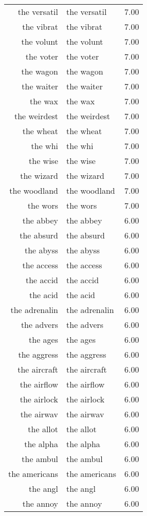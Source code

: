 \begin{table}[ht]
\begin{tabular}{rlr}
  the versatil & the versatil & 7.00 \\ 
  the vibrat & the vibrat & 7.00 \\ 
  the volunt & the volunt & 7.00 \\ 
  the voter & the voter & 7.00 \\ 
  the wagon & the wagon & 7.00 \\ 
  the waiter & the waiter & 7.00 \\ 
  the wax & the wax & 7.00 \\ 
  the weirdest & the weirdest & 7.00 \\ 
  the wheat & the wheat & 7.00 \\ 
  the whi & the whi & 7.00 \\ 
  the wise & the wise & 7.00 \\ 
  the wizard & the wizard & 7.00 \\ 
  the woodland & the woodland & 7.00 \\ 
  the wors & the wors & 7.00 \\ 
  the abbey & the abbey & 6.00 \\ 
  the absurd & the absurd & 6.00 \\ 
  the abyss & the abyss & 6.00 \\ 
  the access & the access & 6.00 \\ 
  the accid & the accid & 6.00 \\ 
  the acid & the acid & 6.00 \\ 
  the adrenalin & the adrenalin & 6.00 \\ 
  the advers & the advers & 6.00 \\ 
  the ages & the ages & 6.00 \\ 
  the aggress & the aggress & 6.00 \\ 
  the aircraft & the aircraft & 6.00 \\ 
  the airflow & the airflow & 6.00 \\ 
  the airlock & the airlock & 6.00 \\ 
  the airwav & the airwav & 6.00 \\ 
  the allot & the allot & 6.00 \\ 
  the alpha & the alpha & 6.00 \\ 
  the ambul & the ambul & 6.00 \\ 
  the americans & the americans & 6.00 \\ 
  the angl & the angl & 6.00 \\ 
  the annoy & the annoy & 6.00 \\ 

\end{tabular}
\end{table}
